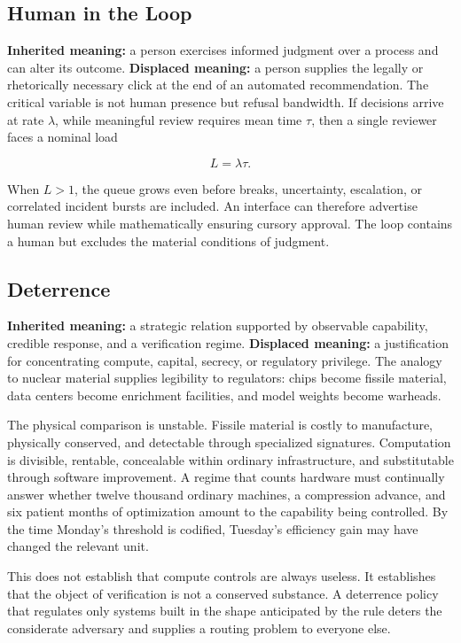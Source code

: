 \documentclass[11pt]{article}
\begin{document}
\subsection*{Human in the Loop}

\textbf{Inherited meaning:} a person exercises informed judgment over a process and can alter its outcome. \textbf{Displaced meaning:} a person supplies the legally or rhetorically necessary click at the end of an automated recommendation. The critical variable is not human presence but refusal bandwidth. If decisions arrive at rate \(\lambda\), while meaningful review requires mean time \(\tau\), then a single reviewer faces a nominal load

\[
  L=\lambda\tau.
\]

When \(L>1\), the queue grows even before breaks, uncertainty, escalation, or correlated incident bursts are included. An interface can therefore advertise human review while mathematically ensuring cursory approval. The loop contains a human but excludes the material conditions of judgment.

\subsection*{Deterrence}

\textbf{Inherited meaning:} a strategic relation supported by observable capability, credible response, and a verification regime. \textbf{Displaced meaning:} a justification for concentrating compute, capital, secrecy, or regulatory privilege. The analogy to nuclear material supplies legibility to regulators: chips become fissile material, data centers become enrichment facilities, and model weights become warheads.

The physical comparison is unstable. Fissile material is costly to manufacture, physically conserved, and detectable through specialized signatures. Computation is divisible, rentable, concealable within ordinary infrastructure, and substitutable through software improvement. A regime that counts hardware must continually answer whether twelve thousand ordinary machines, a compression advance, and six patient months of optimization amount to the capability being controlled. By the time Monday's threshold is codified, Tuesday's efficiency gain may have changed the relevant unit.

This does not establish that compute controls are always useless. It establishes that the object of verification is not a conserved substance. A deterrence policy that regulates only systems built in the shape anticipated by the rule deters the considerate adversary and supplies a routing problem to everyone else.
\end{document}
